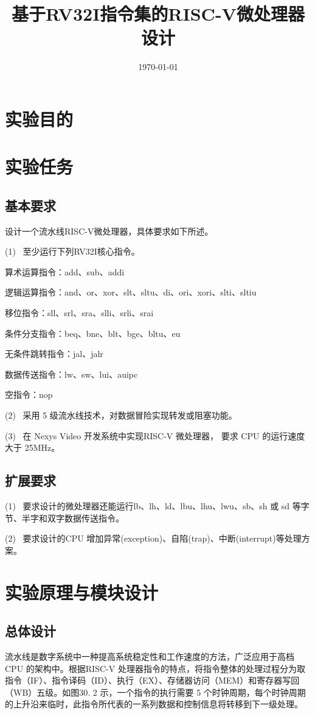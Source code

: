 \documentclass{../source/Experiment}
\title{基于RV32I指令集的RISC-V微处理器设计}
\date{\today}
\begin{document}
\makecover
\makeheader
\section{实验目的}

\section{实验任务}
\subsection{基本要求}
设计一个流水线RISC-V微处理器，具体要求如下所述。

(1) \, 至少运行下列RV32I核心指令。

算术运算指令：add、sub、addi

逻辑运算指令：and、or、xor、slt、sltu、di、ori、xori、slti、sltiu

移位指令：sll、srl、sra、slli、srli、srai

条件分支指令：beq、bne、blt、bge、bltu、eu

无条件跳转指令：jal、jalr

数据传送指令：lw、sw、lui、auipc

空指令：nop

(2) \, 采用 5 级流水线技术，对数据冒险实现转发或阻塞功能。

(3) \, 在 Nexys Video 开发系统中实现RISC-V 微处理器， 要求 CPU 的运行速度大于 25MHz。
\subsection{扩展要求}
(1) \, 要求设计的微处理器还能运行lb、lh、ld、lbu、lhu、lwu、sb、sh 或 sd 等字节、半字和双字数据传送指令。

(2) \, 要求设计的CPU 增加异常(exception)、自陷(trap)、中断(interrupt)等处理方案。

\section{实验原理与模块设计}
\subsection{总体设计}
流水线是数字系统中一种提高系统稳定性和工作速度的方法，广泛应用于高档CPU 的架构中。根据RISC-V 处理器指令的特点，将指令整体的处理过程分为取指令（IF）、指令译码（ID）、执行（EX）、存储器访问（MEM）和寄存器写回（WB）五级。如图30. 2 示，一个指令的执行需要 5 个时钟周期，每个时钟周期的上升沿来临时，此指令所代表的一系列数据和控制信息将转移到下一级处理。
\end{document}
